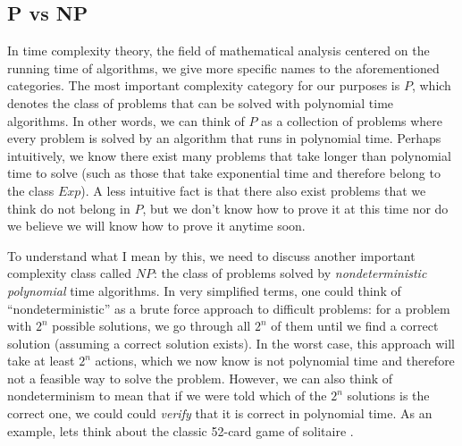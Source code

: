 \subsection{P vs NP}

In time complexity theory, the field of mathematical analysis centered on the
running time of algorithms, we give more specific names to the aforementioned categories.
The most important complexity category for our purposes is $P$,
which denotes the class of problems that can be solved with polynomial time
algorithms. In other words, we can think of $P$ as a collection of problems where every
problem is solved by an algorithm that runs in polynomial time. Perhaps
intuitively, we know there exist many problems
that take longer than polynomial time to solve (such as those that take
exponential time and therefore belong to the class $Exp$). A less intuitive fact is that there
also exist problems that we think do not belong in $P$, but we don't know how to
prove it at this time nor do we believe we will know how to prove it anytime
soon.

To understand what I mean by this, we need to discuss another important
complexity class called $NP$: the class of problems solved by
\textit{nondeterministic polynomial} time algorithms. In very simplified terms,
one could think of “nondeterministic” as a brute force approach to difficult
problems: for a problem with $2^n$ possible solutions, we go through all $2^n$ of them until we find a
correct solution (assuming a correct solution exists). In the worst case, this
approach will take at least $2^n$ actions, which we now know is not polynomial time and
therefore not a feasible way to solve the problem. However, we can also think of
nondeterminism to mean that if we were told which of the $2^n$ solutions is the
correct one, we could could \textit{verify} that it is correct in polynomial
time. As an example, lets think about the classic 52-card game of solitaire \cite{solitaire}. 

